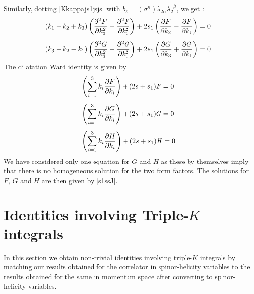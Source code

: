 \documentclass[a4paper,11pt]{article}
\begin{document}
Similarly, dotting \eqref{Kkappajs1jsjs} with $b_{\kappa} = (\sigma^{\kappa})\lambda_{2\alpha}\lambda_2^{\;\;\beta}$, we get :
\begin{align}\label{js1jsjseqn2}
&(k_1-k_2+k_3)\left(\frac{\partial^2 F}{\partial k_3^2}-\frac{\partial^2 F}{\partial k_1^2}\right)+2s_1\left(\frac{\partial F}{\partial k_3}-\frac{\partial F}{\partial k_1}\right)=0\notag\\[5 pt]
&(k_3-k_2-k_1)\left(\frac{\partial^2 G}{\partial k_3^2}-\frac{\partial^2 G}{\partial k_1^2}\right)+2s_1\left(\frac{\partial G}{\partial k_3}+\frac{\partial G}{\partial k_1}\right)=0
\end{align}
The dilatation Ward identity is given by
\begin{align}
&\left(\sum_{i=1}^3 k_i \frac{\partial F}{\partial k_i}\right)+(2s+s_1)F=0\notag\\[5 pt]
&\left(\sum_{i=1}^3 k_i \frac{\partial G}{\partial k_i}\right)+(2s+s_1)G=0\notag\\[5 pt]
&\left(\sum_{i=1}^3 k_i \frac{\partial H}{\partial k_i}\right)+(2s+s_1)H=0
\end{align}
We have considered only one equation for $G$ and $H$ as these by themselves imply that there is no homogeneous solution for the two form factors. The solutions for $F$, $G$ and $H$ are then given by \eqref{s1ssJ}.





\section{Identities involving Triple-$K$ integrals}\label{idtrk}
In this section we obtain non-trivial identities involving triple-$K$ integrals by matching our results obtained for the correlator in spinor-helicity variables to the results obtained for the same in momentum space after converting to spinor-helicity variables. 
\end{document}
